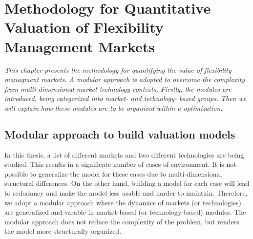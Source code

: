 \chapter{Methodology for Quantitative Valuation of Flexibility Management Markets}
\textit{This chapter presents the methodology for quantifying the value of flexibility managment markets. A modular approach is adopted to overcome the complexity from multi-dimensional market-technology contexts. Firstly, the modules are introduced, being categorized into market- and technology- based groups. Then we will explain how these modules are to be organized within a optimization.}

\section{Modular approach to build valuation models}
In this thesis, a list of different markets and two different technologies are being studied. This results in a significate number of cases of environment. It is not possible to generalize the model for these cases due to multi-dimensional structural differences. On the other hand, building a model for each case will lead to redudancy and make the model less usable and harder to maintain. Therefore, we adopt a modular approach where the dynamics of markets (or technologies) are generalized and varable in market-based (or technology-based) modules. The modular approach does not reduce the complexity of the problem, but renders the model more structurally organized.

